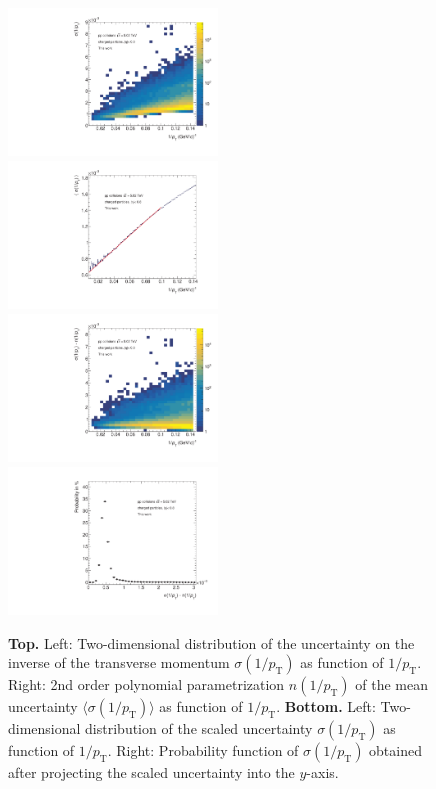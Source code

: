 \documentclass[12pt,a4paper]{report}
\begin{document}
\begin{figure}[tb!]
\centering
\includegraphics[width=0.495\textwidth]{Plots/reso2dim.pdf}  
\includegraphics[width=0.495\textwidth]{Plots/fitfunc.pdf}  
\includegraphics[width=0.495\textwidth]{Plots/scaledcov.pdf}  
\includegraphics[width=0.495\textwidth]{Plots/probabilitydist.pdf}  
\caption{\textbf{Top.} Left: Two-dimensional distribution of the uncertainty on the inverse of the transverse momentum $\sigma(1/p_{\mathrm{T}})$ as function of $1/p_{\mathrm{T}}$. Right: 2nd order polynomial parametrization $n(1/p_{\mathrm{T}})$ of the mean uncertainty $\langle\sigma(1/p_\text{T})\rangle$ as function of $1/p_{\mathrm{T}}$. \textbf{Bottom.} Left: Two-dimensional distribution of the scaled uncertainty $\sigma(1/p_{\mathrm{T}})$ as function of $1/p_{\mathrm{T}}$. Right: Probability function of $\sigma(1/p_\text{T})$ obtained after projecting the scaled uncertainty into the $y$-axis.}
\label{4plots}
\end{figure}
\end{document}
